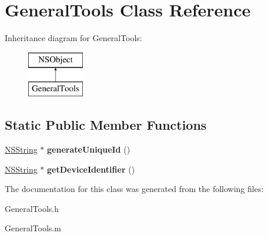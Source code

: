 \hypertarget{interface_general_tools}{
\section{\-General\-Tools \-Class \-Reference}
\label{interface_general_tools}
}
\-Inheritance diagram for \-General\-Tools\-:\begin{figure}[H]
\begin{center}
\leavevmode
\includegraphics[height=2.000000cm]{interface_general_tools}
\end{center}
\end{figure}
\subsection*{\-Static \-Public \-Member \-Functions}
\begin{DoxyCompactItemize}
\item 
\hypertarget{interface_general_tools_ae7b664bf9fcdc97043a88e45df24b993}{
\hyperlink{class_n_s_string}{\-N\-S\-String} $\ast$ {\bfseries generate\-Unique\-Id} ()}
\label{interface_general_tools_ae7b664bf9fcdc97043a88e45df24b993}

\item 
\hypertarget{interface_general_tools_aba7436d27826be45e5523f38f6bd871b}{
\hyperlink{class_n_s_string}{\-N\-S\-String} $\ast$ {\bfseries get\-Device\-Identifier} ()}
\label{interface_general_tools_aba7436d27826be45e5523f38f6bd871b}

\end{DoxyCompactItemize}


\-The documentation for this class was generated from the following files\-:\begin{DoxyCompactItemize}
\item 
\-General\-Tools.\-h\item 
\-General\-Tools.\-m\end{DoxyCompactItemize}
